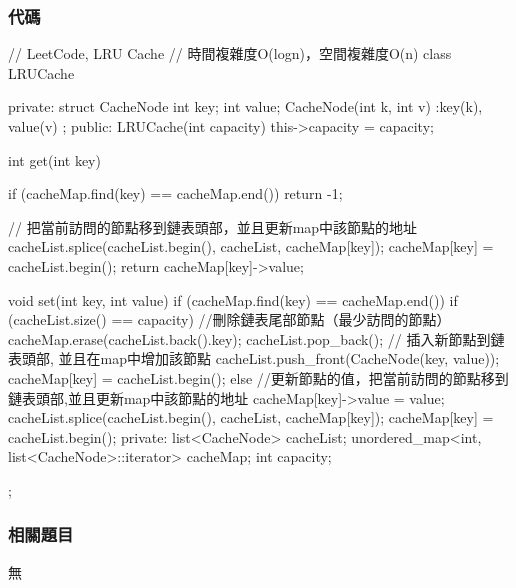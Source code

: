 \subsubsection{代碼}
\begin{Code}
// LeetCode, LRU Cache
// 時間複雜度O(logn)，空間複雜度O(n)
class LRUCache{
private:
    struct CacheNode {
        int key;
        int value;
        CacheNode(int k, int v) :key(k), value(v){}
    };
public:
    LRUCache(int capacity) {
        this->capacity = capacity;
    }

    int get(int key) {
        if (cacheMap.find(key) == cacheMap.end()) return -1;
        
        // 把當前訪問的節點移到鏈表頭部，並且更新map中該節點的地址
        cacheList.splice(cacheList.begin(), cacheList, cacheMap[key]); 
        cacheMap[key] = cacheList.begin();
        return cacheMap[key]->value;
    }

    void set(int key, int value) {
        if (cacheMap.find(key) == cacheMap.end()) {
            if (cacheList.size() == capacity) { //刪除鏈表尾部節點（最少訪問的節點）
                cacheMap.erase(cacheList.back().key);
                cacheList.pop_back();
            }
            // 插入新節點到鏈表頭部, 並且在map中增加該節點
            cacheList.push_front(CacheNode(key, value));
            cacheMap[key] = cacheList.begin();
        } else {
            //更新節點的值，把當前訪問的節點移到鏈表頭部,並且更新map中該節點的地址
            cacheMap[key]->value = value;
            cacheList.splice(cacheList.begin(), cacheList, cacheMap[key]);
            cacheMap[key] = cacheList.begin();
        }
    }
private:
    list<CacheNode> cacheList;
    unordered_map<int, list<CacheNode>::iterator> cacheMap;
    int capacity;
};
\end{Code}


\subsubsection{相關題目}
\begindot
\item 無
\myenddot

